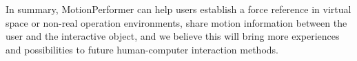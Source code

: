In summary, MotionPerformer can help users establish a force reference in virtual space or non-real operation environments, share motion information between the user and the interactive object, and we believe this will bring more experiences and possibilities to future human-computer interaction methods.